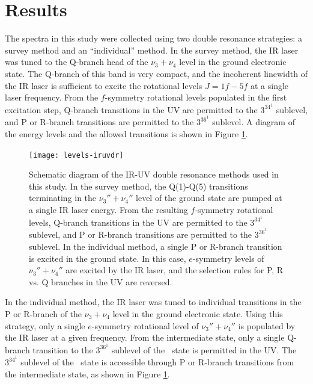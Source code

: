 \documentclass[12pt]{mitthesis}
\begin{document}
\section{Results}

The spectra in this study were collected using two double resonance
strategies: a survey method and an ``individual'' method.  In the
survey method, the IR laser was tuned to the Q-branch head of the
$\nu_3+\nu_4$ level in the ground electronic state.  The Q-branch of
this band is very compact, and the incoherent linewidth of the IR
laser is sufficient to excite the rotational levels $J=1f-5f$ at a
single laser frequency.  From the $f$-symmetry rotational levels
populated in the first excitation step, Q-branch transitions in the UV
are permitted to the $3^34^1$  sublevel, and P or R-branch
transitions are permitted to the $3^36^1$  sublevel.  A diagram
of the energy levels and the allowed transitions is shown in Figure
\ref{fig:levels-iruvdr}.

\begin{figure}
  \centering
  
  \texttt{[image: levels-iruvdr]}

  \caption{Schematic diagram of the IR-UV double resonance methods
    used in this study.  In the survey method, the Q(1)-Q(5)
    transitions terminating in the $\nu_3''+\nu_4''$ level of the
    ground state are pumped at a single IR laser energy.  From the
    resulting $f$-symmetry rotational levels, Q-branch transitions in
    the UV are permitted to the $3^34^1$  sublevel, and P or
    R-branch transitions are permitted to the $3^36^1$ 
    sublevel.  In the individual method, a single P or R-branch
    transition is excited in the ground state.  In this case,
    $e$-symmetry levels of $\nu_3''+\nu_4''$ are excited by the IR
    laser, and the selection rules for P, R vs. Q branches in the UV
    are reversed.}
  \label{fig:levels-iruvdr}
\end{figure}

In the individual method, the IR laser was tuned to individual
transitions in the P or R-branch of the $\nu_3+\nu_4$ level in the
ground electronic state.  Using this strategy, only a single
$e$-symmetry rotational level of $\nu_3''+\nu_4''$ is populated by the
IR laser at a given frequency.  From the intermediate state, only a
single Q-branch transition to the $3^36^1$  sublevel of the
\astate\ state is permitted in the UV.  The $3^34^1$  sublevel
of the \astate\ state is accessible through P or R-branch transitions
from the intermediate state, as shown in Figure
\ref{fig:levels-iruvdr}.
\end{document}
